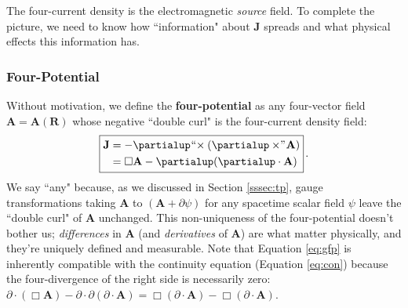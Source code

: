 \documentclass[12pt]{article}
\renewcommand{\vv}[1]{\mathbf{#1}}
\begin{document}
The four-current density is the electromagnetic \emph{source} field. To complete the picture, we need to know how ``information" about $\vv J$ spreads and what physical effects this information has.


\subsubsection{Four-Potential}

Without motivation, we define the \textbf{four-potential} as any four-vector field $\vv A = \vv A (\vv R)$ whose negative ``double curl" is the four-current density field:
\begin{equation}\label{eq:gfp}
\boxed{
\begin{split}
\vv J &= - \partialup \mkern1mu `` \mkern-4mu \times ( \partialup \times \mkern-4mu " \mkern1mu \vv A ) \\
&= \Box \vv A - \partialup ( \partialup \cdot \vv A)
\end{split}
} \, .
\end{equation}
We say ``any" because, as we discussed in Section \ref{sssec:tp}, gauge transformations taking $\vv A$ to $(\vv A + \partialup \psi)$ for any spacetime scalar field $\psi$ leave the ``double curl" of $\vv A$ unchanged. This non-uniqueness of the four-potential doesn't bother us; \emph{differences} in $\vv A$ (and \emph{derivatives} of $\vv A$) are what matter physically, and they're uniquely defined and measurable. Note that Equation \ref{eq:gfp} is inherently compatible with the continuity equation (Equation \ref{eq:con}) because the four-divergence of the right side is necessarily zero: $\partialup \cdot (\Box \vv A) - \partialup \cdot \partialup (\partialup \cdot \vv A) = \Box (\partialup \cdot \vv A) - \Box (\partialup \cdot \vv A)$. 
\end{document}
